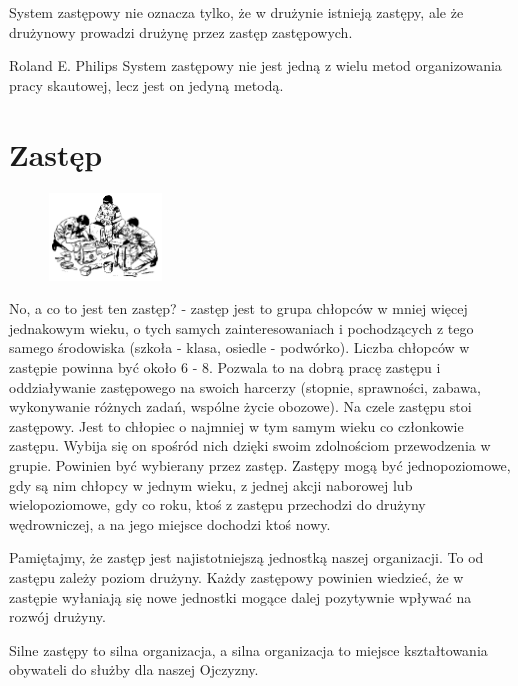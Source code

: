 System zastępowy nie oznacza tylko, że w drużynie istnieją zastępy, ale że drużynowy prowadzi drużynę przez zastęp zastępowych.

\begin{aquote}{Roland E. Philips}
  System  zastępowy  nie  jest  jedną  z  wielu  metod organizowania  pracy  skautowej, lecz jest  on  jedyną  metodą.
 \end{aquote}
 
 
\section{Zastęp}
\begin{figure}
  \begin{center}
    \includegraphics[width=3cm]{grafiki/zastep.png}
  \end{center}
\end{figure}No, a co to jest ten zastęp? - zastęp jest to grupa chłopców w mniej więcej jednakowym wieku, o tych samych zainteresowaniach i pochodzących z  tego samego środowiska (szkoła - klasa, osiedle - podwórko). 
Liczba  chłopców  w  zastępie  powinna  być około 6 - 8. Pozwala to na dobrą pracę zastępu i oddziaływanie zastępowego  na swoich harcerzy (stopnie, sprawności, zabawa, wykonywanie różnych zadań, wspólne życie obozowe). 
Na czele zastępu stoi zastępowy. 
Jest to chłopiec  o najmniej w tym samym  wieku co członkowie zastępu. Wybija się on spośród nich dzięki swoim zdolnościom przewodzenia w grupie. 
Powinien być wybierany przez zastęp. 
Zastępy mogą być jednopoziomowe, gdy są nim chłopcy w jednym wieku, z jednej akcji naborowej lub wielopoziomowe, gdy co roku, ktoś z zastępu przechodzi do drużyny wędrowniczej, a na jego miejsce dochodzi ktoś nowy.

Pamiętajmy,  że zastęp jest najistotniejszą jednostką naszej organizacji. 
To od zastępu zależy poziom drużyny. 
Każdy zastępowy powinien wiedzieć, że w zastępie wyłaniają się nowe jednostki mogące dalej pozytywnie wpływać  na  rozwój  drużyny.

Silne zastępy to silna organizacja, a silna organizacja to miejsce kształtowania obywateli do  służby dla naszej Ojczyzny.
	

